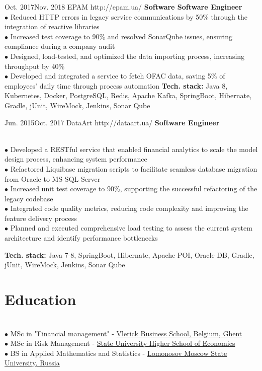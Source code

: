 \documentclass[10pt]{article} %
\begin{document}
\job
{Oct. 2017}{Nov. 2018}
{EPAM}
{http://epam.ua/}
{\textbf{Software Software Engineer}}
{
\textbf{}    
\\$\bullet$ Reduced HTTP errors in legacy service communications by 50\% through the integration of reactive libraries
\\$\bullet$ Increased test coverage to 90\% and resolved SonarQube issues, ensuring compliance during a company audit
\\$\bullet$ Designed, load-tested, and optimized the data importing process, increasing throughput by 40\%
\\$\bullet$ Developed and integrated a service to fetch OFAC data, saving 5\% of employees’ daily time through process automation
\vadjust{\vspace{4pt}}
\newline
\textbf{Tech. stack: }{Java 8, Kubernetes, Docker, PostgreSQL, Redis, Apache Kafka, SpringBoot, Hibernate, Gradle, jUnit, WireMock, Jenkins, Sonar Qube}  
 }

\job
{Jun. 2015}{Oct. 2017}
{DataArt}
{http://dataart.ua/}
{\textbf{Software Engineer}}
{
\textbf{}  
\\$\bullet$ Developed a RESTful service that enabled financial analytics to scale the model design process, enhancing system performance
\\$\bullet$ Refactored Liquibase migration scripts to facilitate seamless database migration from Oracle to MS SQL Server
\\$\bullet$ Increased unit test coverage to 90\%, supporting the successful refactoring of the legacy codebase
\\$\bullet$ Integrated code quality metrics, reducing code complexity and improving the feature delivery process
\\$\bullet$ Planned and executed comprehensive load testing to assess the current system architecture and identify performance bottlenecks
\vadjust{\vspace{4pt}}
\newline

\textbf{Tech. stack: }{Java 7-8, SpringBoot, Hibernate, Apache POI, Oracle DB, Gradle, jUnit, WireMock, Jenkins, Sonar Qube}  
 }
 
 \section{Education}
 {
 \textbf{}  
 \\$\bullet$ MSc in "Financial management"  - \href{https://www.vlerick.com/en}{Vlerick Business School, Belgium, Ghent}
\\$\bullet$  MSc in Risk Management  - \href{https://www.hse.ru}{State University  Higher School of Economics}
\\$\bullet$  BS in Applied Mathematics and Statistics - \href{http://www.msu.ru/en/}{Lomonosov Moscow State University, Russia}
 }
\end{document}
